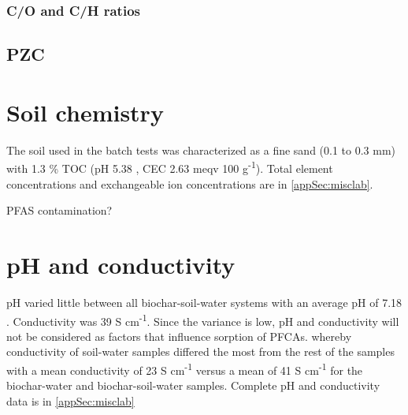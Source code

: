 \subsubsection{C/O and C/H ratios}

\subsection{PZC}


\section{Soil chemistry}
The soil used in the batch tests was characterized as a fine sand (0.1 to 0.3 mm) with 1.3 \% TOC (pH 5.38  , CEC 2.63  meqv 100 g\textsuperscript{-1}). Total element concentrations and exchangeable ion concentrations are in \ref{appSec:misclab}. 

PFAS contamination?

\begin{table}
\centering
\caption{pH, conductivity, TOC and total nitrogen, cation exchange capacity (CEC) for the soil blank used in the batch tests}
\label{tab:soilsummary}
\end{table}

\section{pH and conductivity}
pH varied little between all biochar-soil-water systems with an average pH of 7.18 .
Conductivity was 39  \textmu S cm\textsuperscript{-1}. Since the variance is low, pH and conductivity will not be considered as factors that influence sorption of PFCAs. whereby conductivity of soil-water samples differed the most from the rest of the samples with a mean conductivity of 23  \textmu S cm\textsuperscript{-1} versus a mean of 41  \textmu S cm\textsuperscript{-1} for the biochar-water and biochar-soil-water samples. Complete pH and conductivity data is in \cref{appSec:misclab} 

